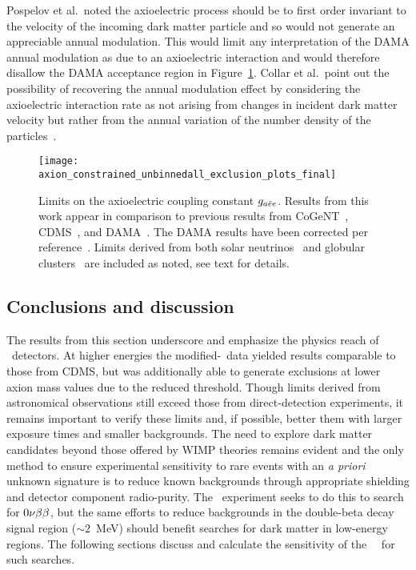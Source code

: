 	Pospelov et al.~noted the axioelectric process should be to first order invariant to the velocity of the incoming dark matter particle and so would not generate an appreciable annual modulation.  This would limit any interpretation of the DAMA annual modulation as due to an axioelectric interaction and would therefore disallow the DAMA acceptance region in Figure~\ref{fig:HeavyAxionLimits}.  Collar et al.~point out the possibility of recovering the annual modulation effect by considering the axioelectric interaction rate as not arising from changes in incident dark matter velocity but rather from the annual variation of the number density of the particles~\cite{Collar:2009sp}. 
			
		\begin{figure}
			\centering
			\texttt{[image: axion\_constrained\_unbinnedall\_exclusion\_plots\_final]}
			\caption[Limits on the axioelectric coupling constant $\gaa$]{Limits on the axioelectric 
			coupling constant $\gaa$.  Results from this work appear in comparison to previous 
			results from CoGeNT~\cite{Aalseth:2008aa}, CDMS~\cite{Ahmed2009}, and 
			DAMA~\cite{Bernabei:2005ca}.  The DAMA results have been corrected per 
			reference~\cite{Collar:2009sp}.  Limits derived from both solar neutrinos~\cite{Gondolo09} and globular clusters~\cite{Raffelt95} are included as noted, see text for details.}
			\label{fig:HeavyAxionLimits}
		\end{figure}
		
	\subsection{Conclusions and discussion}
	\label{sec:DiscOnHeavyAxionLimits}	

	
	The results from this section underscore and emphasize the physics reach of \ppc~detectors. At higher energies the modified-\bege~data yielded results comparable to those from CDMS, but was additionally able to generate exclusions at lower axion mass values due to the reduced threshold.  Though limits derived from astronomical observations still exceed those from direct-detection experiments, it remains important to verify these limits and, if possible, better them with larger exposure times and smaller backgrounds.  The need to explore dark matter candidates beyond those offered by WIMP theories remains evident and the only method to ensure experimental sensitivity to rare events with an \emph{a priori} unknown signature is to reduce known backgrounds through appropriate shielding and detector component radio-purity.  The \MJ~experiment seeks to do this to search for $0 \nu \beta \beta$, but the same efforts to reduce backgrounds in the double-beta decay signal region ($\sim2$~MeV) should benefit searches for dark matter in low-energy regions.  The following sections discuss and calculate the sensitivity of the \MJ~\minmod~for such searches.
							
